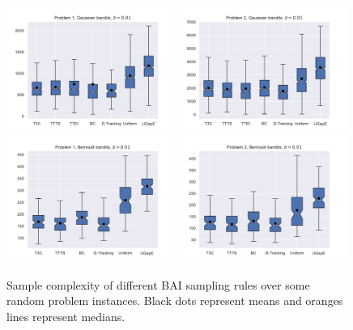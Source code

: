 \begin{figure}[ht]
\centering
\includegraphics[clip, width= 0.49\textwidth]{Chapter3/img/gaussian1.pdf}
\includegraphics[clip, width= 0.49\textwidth]{Chapter3/img/gaussian2.pdf}
\includegraphics[clip, width= 0.49\textwidth]{Chapter3/img/bernoulli1.pdf}
\includegraphics[clip, width= 0.49\textwidth]{Chapter3/img/bernoulli2.pdf}
\caption{Sample complexity of different BAI sampling rules over some random problem instances. Black dots represent means and oranges lines represent medians.}
\label{fig:confidence}
\end{figure}

